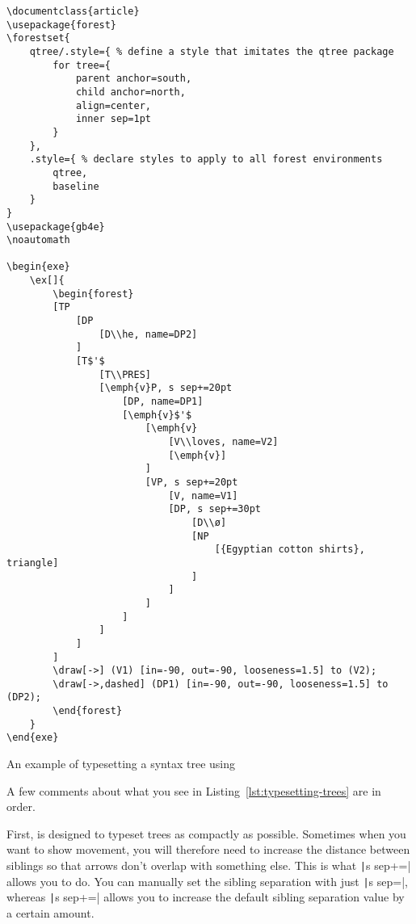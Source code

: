 \begin{listing}[htbp]
	\centering
	\begin{verbatim}
\documentclass{article}
\usepackage{forest}
\forestset{
    qtree/.style={ % define a style that imitates the qtree package
        for tree={
            parent anchor=south,
            child anchor=north,
            align=center,
            inner sep=1pt
        }
    },
    .style={ % declare styles to apply to all forest environments
        qtree,
        baseline
    }
}
\usepackage{gb4e}
\noautomath

\begin{exe}
    \ex[]{
        \begin{forest}
        [TP
            [DP
                [D\\he, name=DP2]
            ]
            [T$'$
                [T\\PRES]
                [\emph{v}P, s sep+=20pt
                    [DP, name=DP1]
                    [\emph{v}$'$
                        [\emph{v}
                            [V\\loves, name=V2]
                            [\emph{v}]
                        ]
                        [VP, s sep+=20pt
                            [V, name=V1]
                            [DP, s sep+=30pt
                                [D\\ø]
                                [NP
                                    [{Egyptian cotton shirts}, triangle]
                                ]
                            ]
                        ]
                    ]
                ]
            ]
        ]
        \draw[->] (V1) [in=-90, out=-90, looseness=1.5] to (V2);
        \draw[->,dashed] (DP1) [in=-90, out=-90, looseness=1.5] to (DP2);
        \end{forest}
    }
\end{exe}

	\end{verbatim}
	\caption{An example of typesetting a syntax tree using }
	\label{lst:typesetting-trees}
\end{listing}

A few comments about what you see in Listing~\ref{lst:typesetting-trees} are in order.

First,  is designed to typeset trees as compactly as possible.
Sometimes when you want to show movement, you will therefore need to increase the distance between siblings so that arrows don't overlap with something else.
This is what \texttt|s sep+=| allows you to do.
You can manually set the sibling separation with just \texttt|s sep=|, whereas \texttt|s sep+=| allows you to increase the default sibling separation value by a certain amount.

